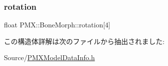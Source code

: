 \mbox{\label{struct_p_m_x_1_1_bone_morph_a765b017153f5f2723061b9193b872515}} 
\subsubsection{\texorpdfstring{rotation}{rotation}}
{\footnotesize\ttfamily float P\+M\+X\+::\+Bone\+Morph\+::rotation\mbox{[}4\mbox{]}}



この構造体詳解は次のファイルから抽出されました\+:\begin{DoxyCompactItemize}
\item 
Source/\mbox{\hyperlink{_p_m_x_model_data_info_8h}{P\+M\+X\+Model\+Data\+Info.\+h}}\end{DoxyCompactItemize}
